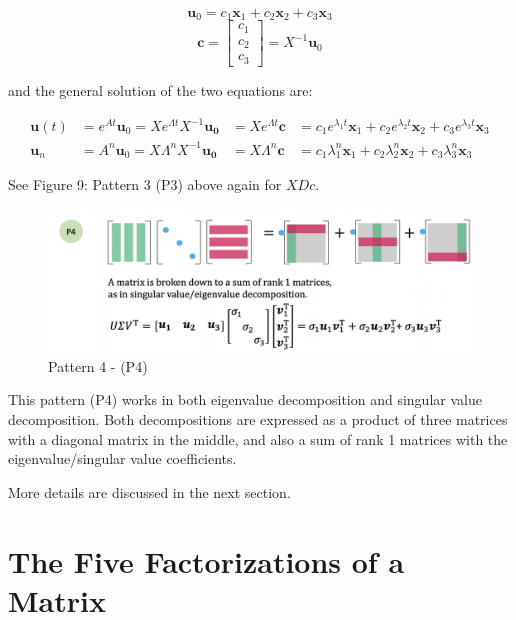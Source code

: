 \documentclass[letterpaper]{article}
\begin{document}
\begin{equation*}
  \bm{u}_0 = c_1 \bm{x}_1 + c_2 \bm{x}_2 + c_3 \bm{x}_3
\end{equation*}
\begin{equation*}
  \bm{c} =
  \begin{bmatrix}
    c_1\\
    c_2\\
    c_3
  \end{bmatrix} = X^{-1} \bm{u}_0
\end{equation*}

and the general solution of the two equations are:

\begin{align*}
  \bm{u}(t) &= e^{At} \bm{u}_0 = X e^{\Lambda t} X^{-1} \bm{u_0} &= X e^{\Lambda t} \bm{c} &= c_1 e^{\lambda_1 t} \bm{x}_1 + c_2 e^{\lambda_2 t} \bm{x}_2 + c_3 e^{\lambda_3 t} \bm{x}_3\\
  \bm{u}_n &= A^n \bm{u}_0 = X \Lambda^n X^{-1} \bm{u_0} &= X \Lambda^n \bm{c} &= c_1 \lambda_1^n \bm{x}_1 + c_2 \lambda_2^n \bm{x}_2 + c_3 \lambda_3^n \bm{x}_3
\end{align*}

See Figure 9: Pattern 3 (P3) above again for $XDc$.

\begin{figure}[H]
  \includegraphics[keepaspectratio, width=\linewidth]{Pattern4.png}
  \caption{Pattern 4 - (P4)}
\end{figure}

This pattern (P4) works in both eigenvalue decomposition and singular value decomposition.
Both decompositions are expressed as a product of three matrices with a diagonal matrix in the middle,
and also a sum of rank 1 matrices with the eigenvalue/singular value coefficients.

More details are discussed in the next section.

\clearpage

\section{The Five Factorizations of a Matrix}
\end{document}
